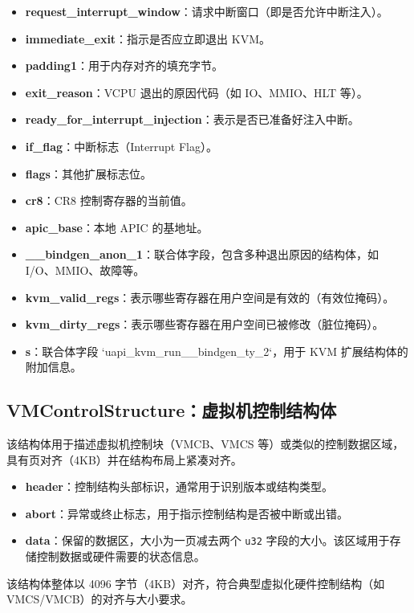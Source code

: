 \documentclass[analyze]{mancls}
\begin{document}
\begin{itemize}
    \item \textbf{request\_interrupt\_window}：请求中断窗口（即是否允许中断注入）。
    \item \textbf{immediate\_exit}：指示是否应立即退出 KVM。
    \item \textbf{padding1}：用于内存对齐的填充字节。
    \item \textbf{exit\_reason}：VCPU 退出的原因代码（如 IO、MMIO、HLT 等）。
    \item \textbf{ready\_for\_interrupt\_injection}：表示是否已准备好注入中断。
    \item \textbf{if\_flag}：中断标志（Interrupt Flag）。
    \item \textbf{flags}：其他扩展标志位。
    \item \textbf{cr8}：CR8 控制寄存器的当前值。
    \item \textbf{apic\_base}：本地 APIC 的基地址。
    \item \textbf{\_\_bindgen\_anon\_1}：联合体字段，包含多种退出原因的结构体，如 I/O、MMIO、故障等。
    \item \textbf{kvm\_valid\_regs}：表示哪些寄存器在用户空间是有效的（有效位掩码）。
    \item \textbf{kvm\_dirty\_regs}：表示哪些寄存器在用户空间已被修改（脏位掩码）。
    \item \textbf{s}：联合体字段 `uapi\_kvm\_run\_\_bindgen\_ty\_2`，用于 KVM 扩展结构体的附加信息。
\end{itemize}

\subsection{VMControlStructure：虚拟机控制结构体}
该结构体用于描述虚拟机控制块（VMCB、VMCS 等）或类似的控制数据区域，具有页对齐（4KB）并在结构布局上紧凑对齐。

\begin{itemize}
    \item \textbf{header}：控制结构头部标识，通常用于识别版本或结构类型。
    \item \textbf{abort}：异常或终止标志，用于指示控制结构是否被中断或出错。
    \item \textbf{data}：保留的数据区，大小为一页减去两个 \texttt{u32} 字段的大小。该区域用于存储控制数据或硬件需要的状态信息。
\end{itemize}

该结构体整体以 4096 字节（4KB）对齐，符合典型虚拟化硬件控制结构（如 VMCS/VMCB）的对齐与大小要求。
\end{document}
